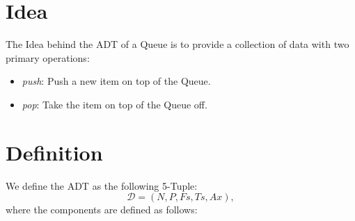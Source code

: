 \documentclass{article}
\begin{document}
\section*{Idea}
The Idea behind the ADT of a Queue is to provide a collection of data with two primary operations:

\begin{itemize}
	\item \emph{push}: Push a new item on top of the Queue.
	\item \emph{pop}: Take the item on top of the Queue off.
\end{itemize}


\section*{Definition}

We define the ADT as the following 5-Tuple:
\[\mathcal{D} = (N, P, Fs, Ts, Ax),\]
where the components are defined as follows:
\end{document}
